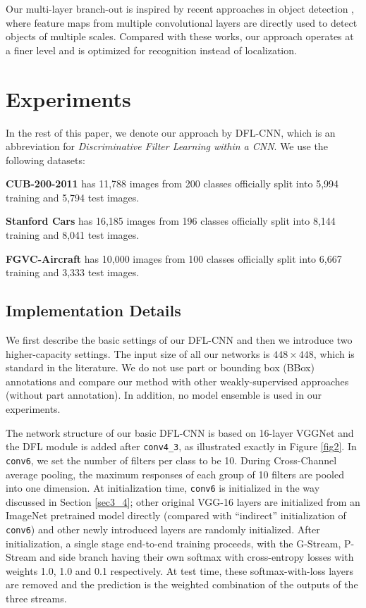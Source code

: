 \documentclass[10pt,twocolumn,letterpaper]{article}
\begin{document}
Our multi-layer branch-out is inspired by recent approaches in object detection \cite{ssd,
fanyang16}, where feature maps from multiple convolutional layers are directly used to detect objects of 
multiple scales. Compared with these works, our approach operates at a finer level
and is optimized for recognition instead of localization.

\section{Experiments} \label{sec4}
In the rest of this paper, we denote our approach by DFL-CNN, which is an abbreviation for \textit{Discriminative Filter Learning within a
CNN}. We use the following datasets: 

\noindent\textbf{CUB-200-2011} \cite{cub2011} has 11,788 images from 200 classes officially split into 5,994
training and 5,794 test images. 

\noindent\textbf{Stanford Cars} \cite{car196} has 16,185 images from 196 classes officially split into 8,144
training and 8,041 test images.

\noindent\textbf{FGVC-Aircraft} \cite{fgvc_air} has 10,000 images from 100 classes officially split into
 6,667 training and 3,333 test images.
\subsection{Implementation Details} \label{sec4_2}
We first describe the basic settings of our DFL-CNN and then we introduce two higher-capacity
settings. The input size of all our networks is $448\times448$, which is standard in the literature. We do not use part
or bounding box (BBox) annotations and compare our method with other weakly-supervised approaches (without part
annotation). In addition, no model ensemble is used in our experiments.

The network structure of our basic DFL-CNN is based on 16-layer VGGNet \cite{vgg} and the DFL module is added after
\texttt{conv4\_3}, as illustrated exactly in Figure \ref{fig2}.
In \texttt{conv6}, we set the number of filters per class to be 10. During Cross-Channel average
pooling, the maximum responses of each group of 10 filters are pooled into one dimension. At initialization time,
\texttt{conv6} is initialized in the way discussed in Section \ref{sec3_4}; other original VGG-16 layers are initialized
from an ImageNet pretrained model directly (compared with ``indirect'' initialization of \texttt{conv6}) and other newly
introduced layers are randomly initialized. After initialization, a single stage end-to-end training proceeds, with the
G-Stream, P-Stream and side branch having their own softmax with cross-entropy losses with 
weights 1.0, 1.0 and 0.1 respectively. At test time, these softmax-with-loss layers are removed and the prediction is
the weighted combination of the outputs of the three streams.
\end{document}

